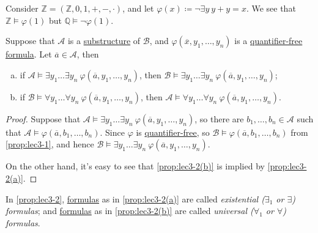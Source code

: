 \begin{eg}
	Consider \(\mathbb{Z} =(\mathbb{Z} , 0, 1, +, -, \cdot)\), and let \(\varphi (x)\coloneqq \lnot \exists y\ y + y = x\). We see that \(\mathbb{Z} \models \varphi (1)\) but \(\mathbb{Q} \models \lnot \varphi (1)\).
\end{eg}

\begin{proposition}\label{prop:lec3-2}
	Suppose that \(\mathcal{A} \) is a \hyperref[def:substructure]{substructure} of \(\mathcal{B} \), and \(\varphi (\overline{x}, y_1, \ldots , y_n )\) is a \hyperref[not:quantifier-free-formula]{quantifier-free} \hyperref[def:formula]{formula}. Let \(\overline{a} \in \mathcal{A} \), then
	\begin{enumerate}[(a)]
		\item\label{prop:lec3-2(a)} if \(\mathcal{A} \models \exists y_1 \ldots \exists y_n\ \varphi (\overline{a} , y_1, \ldots , y_n)\), then \(\mathcal{B} \models \exists y_1\ldots \exists y_n\ \varphi (\overline{a} , y_1, \ldots , y_n)\);
		\item\label{prop:lec3-2(b)} if \(\mathcal{B} \models \forall y_1 \ldots \forall y_n\ \varphi (\overline{a} , y_1, \ldots , y_n)\), then \(\mathcal{A} \models \forall y_1 \ldots \forall y_n\ \varphi (\overline{a} , y_1, \ldots , y_n)\).
	\end{enumerate}
\end{proposition}
\begin{proof}
	Suppose that \(\mathcal{A} \models \exists y_1 \ldots \exists y_n\ \varphi (\overline{a} , y_1, \ldots , y_n)\), so there are \(b_1, \ldots , b_n \in \mathcal{A} \) such that \(\mathcal{A} \models \varphi (\overline{a} , b_1, \ldots , b_n)\). Since \(\varphi \) is \hyperref[not:quantifier-free-formula]{quantifier-free}, so \(\mathcal{B} \models \varphi (\overline{a} , b_1, \ldots , b_n)\) from \autoref{prop:lec3-1}, and hence \(\mathcal{B} \models \exists y_1 \ldots \exists y_n \ \varphi (\overline{a} , y_1, \ldots , y_n)\).

	On the other hand, it's easy to see that \autoref{prop:lec3-2(b)} is implied by \autoref{prop:lec3-2(a)}.
\end{proof}

\begin{notation}
	In \autoref{prop:lec3-2}, \hyperref[def:formula]{formulas} as in \autoref{prop:lec3-2(a)} are called \emph{existential (\(\exists _1\) or \(\exists \)) formulas}; and \hyperref[def:formula]{formulas} as in \autoref{prop:lec3-2(b)} are called \emph{universal (\(\forall _1\) or \(\forall \)) formulas}.
\end{notation}

